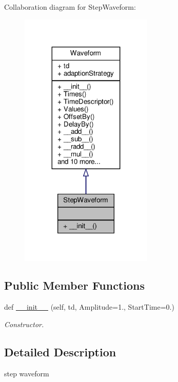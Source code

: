Collaboration diagram for Step\+Waveform\+:
\nopagebreak
\begin{figure}[H]
\begin{center}
\leavevmode
\includegraphics[width=179pt]{classSignalIntegrity_1_1TimeDomain_1_1Waveform_1_1StepWaveform_1_1StepWaveform__coll__graph}
\end{center}
\end{figure}
\subsection*{Public Member Functions}
\begin{DoxyCompactItemize}
\item 
def \hyperlink{classSignalIntegrity_1_1TimeDomain_1_1Waveform_1_1StepWaveform_1_1StepWaveform_abd2454a23c07e228bb0e4b5375d80320}{\+\_\+\+\_\+init\+\_\+\+\_\+} (self, td, Amplitude=1., Start\+Time=0.)
\begin{DoxyCompactList}\small\item\em Constructor. \end{DoxyCompactList}\end{DoxyCompactItemize}


\subsection{Detailed Description}
step waveform 

